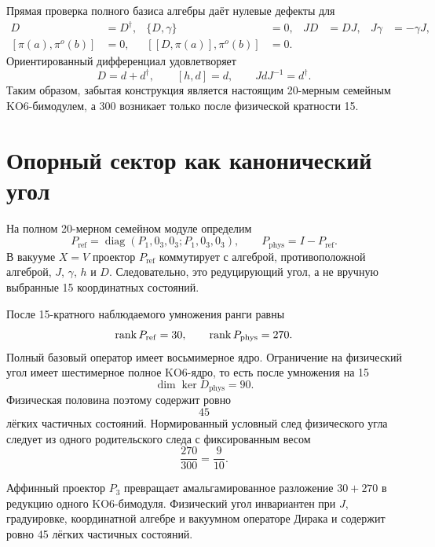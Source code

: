 Прямая проверка полного базиса алгебры даёт нулевые дефекты для
\begin{align}
 D&=D^\dagger,&
 \{D,\gamma\}&=0,&
 JD&=DJ,&
 J\gamma&=-\gamma J,\\
 [\pi(a),\pi^o(b)]&=0,&
 [[D,\pi(a)],\pi^o(b)]&=0.
\end{align}
Ориентированный дифференциал удовлетворяет
\begin{equation}
 D=d+d^\dagger,
 \qquad
 [h,d]=d,
 \qquad
 JdJ^{-1}=d^\dagger.
\end{equation}
Таким образом, забытая конструкция является настоящим 20-мерным
семейным KO6-бимодулем, а 300 возникает только после физической кратности
15.

\section{Опорный сектор как канонический угол}

На полном 20-мерном семейном модуле определим
\begin{equation}
 P_{\mathrm{ref}}
 =\operatorname{diag}(P_1,0_3,0_3;
                       P_1,0_3,0_3),
 \qquad
 P_{\mathrm{phys}}=I-P_{\mathrm{ref}}.
 \label{eq:v5-affine-reference-projector}
\end{equation}
В вакууме $X=V$ проектор $P_{\mathrm{ref}}$ коммутирует с алгеброй,
противоположной алгеброй, $J$, $\gamma$, $h$ и $D$. Следовательно, это
редуцирующий угол, а не вручную выбранные 15 координатных состояний.

После 15-кратного наблюдаемого умножения ранги равны
\begin{equation}
 \operatorname{rank} P_{\mathrm{ref}}=30,
 \qquad
 \operatorname{rank} P_{\mathrm{phys}}=270.
\end{equation}
Полный базовый оператор имеет восьмимерное ядро. Ограничение на физический
угол имеет шестимерное полное KO6-ядро, то есть после умножения на 15
\begin{equation}
 \dim\ker D_{\mathrm{phys}}=90.
\end{equation}
Физическая половина поэтому содержит ровно
\begin{equation}
 \boxed{45}
\end{equation}
лёгких частичных состояний. Нормированный условный след физического угла
следует из одного родительского следа с фиксированным весом
\begin{equation}
 \frac{270}{300}=\frac9{10}.
\end{equation}

\begin{theorem}
Аффинный проектор $P_3$ превращает амальгамированное разложение
$30+270$ в редукцию одного KO6-бимодуля. Физический угол инвариантен при
$J$, градуировке, координатной алгебре и вакуумном операторе Дирака и
содержит ровно 45 лёгких частичных состояний.
\end{theorem}

